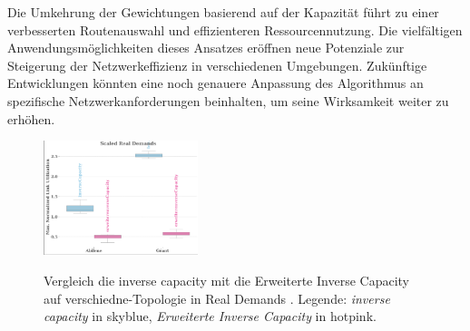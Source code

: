 \documentclass[sigconf, nonacm, review]{acmart}
\begin{document}
Die Umkehrung der Gewichtungen basierend auf der Kapazität führt zu einer verbesserten Routenauswahl und effizienteren Ressourcennutzung. Die vielfältigen Anwendungsmöglichkeiten dieses Ansatzes eröffnen neue Potenziale zur Steigerung der Netzwerkeffizienz in verschiedenen Umgebungen. Zukünftige Entwicklungen könnten eine noch genauere Anpassung des Algorithmus an spezifische Netzwerkanforderungen beinhalten, um seine Wirksamkeit weiter zu erhöhen.

\begin{figure}
\centering
{\hspace{+6cm}\includegraphics[width=0.4\textwidth]{a5.png}} 
\caption{Vergleich die inverse capacity mit die Erweiterte Inverse Capacity auf verschiedne-Topologie in Real Demands  . Legende: \emph{inverse capacity} in skyblue, \emph{Erweiterte Inverse Capacity} in hotpink.}
\label{fig:11}
\end{figure}
\end{document}
